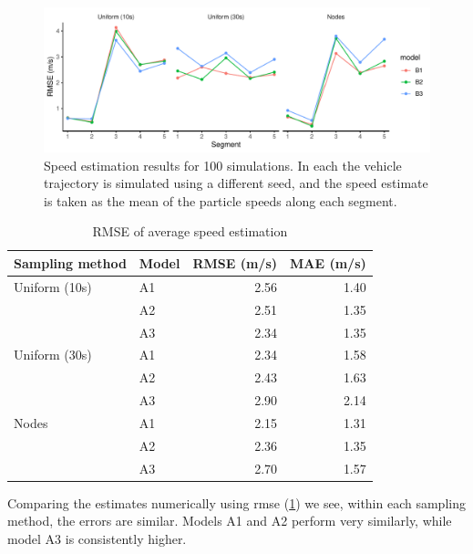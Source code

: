 \begin{knitrout}\small
{}\color{fgcolor}\begin{figure}
\includegraphics[width=\maxwidth]{figure/sim2_pf_full-1} \caption[Speed estimation results for 100 simulations]{Speed estimation results for 100 simulations. In each the vehicle trajectory is simulated using a different seed, and the speed estimate is taken as the mean of the particle speeds along each segment.}\label{fig:sim2_pf_full}
\end{figure}

\begin{table}

\caption{\label{tab:sim2_pf_full}RMSE of average speed estimation}
\centering
\fontsize{8}{10}\selectfont
\begin{tabular}[t]{llrr}
\toprule
Sampling method & Model & RMSE (m/s) & MAE (m/s)\\
\midrule
Uniform (10s) & A1 & 2.56 & 1.40\\
 & A2 & 2.51 & 1.35\\
 & A3 & 2.34 & 1.35\\
\midrule
Uniform (30s) & A1 & 2.34 & 1.58\\
 & A2 & 2.43 & 1.63\\
 & A3 & 2.90 & 2.14\\
\midrule
Nodes & A1 & 2.15 & 1.31\\
 & A2 & 2.36 & 1.35\\
 & A3 & 2.70 & 1.57\\
\bottomrule
\end{tabular}
\end{table}


\end{knitrout}



Comparing the estimates numerically using \gls{rmse} (\cref{tab:sim2_pf_full}) we see, within each sampling method, the errors are similar. Models A1 and A2 perform very similarly, while model A3 is consistently higher.



